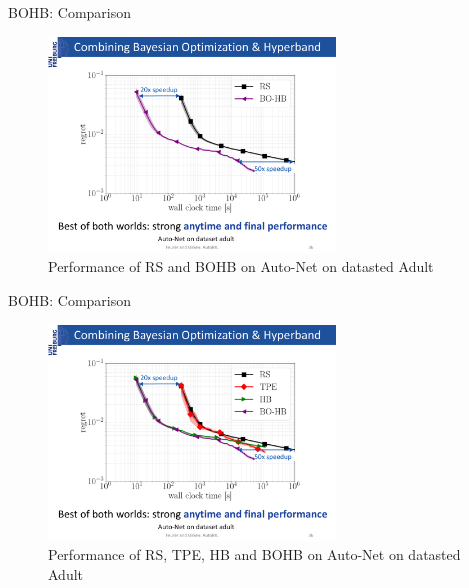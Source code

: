\begin{frame}{BOHB: Comparison}
\begin{figure}
    \centering
    \includegraphics[width=0.68\textwidth]{../w07_hpo_speedup/images/bohb/BOHB_3.pdf}
    \caption{Performance of RS and BOHB on Auto-Net on datasted Adult}
\end{figure}

\end{frame}
\begin{frame}{BOHB: Comparison}
\begin{figure}
    \centering
    \includegraphics[width=0.68\textwidth]{../w07_hpo_speedup/images/bohb/BOHB_4.pdf}
    \caption{Performance of RS, TPE, HB and BOHB on Auto-Net on datasted Adult}
\end{figure}

\end{frame}
